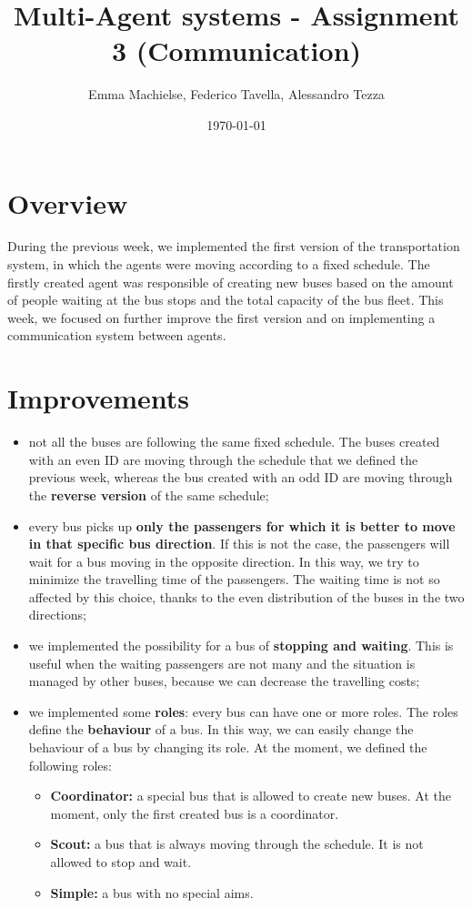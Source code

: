 \documentclass[a4paper]{article}
\title{Multi-Agent systems - Assignment 3 (Communication)}
\author{Emma Machielse, Federico Tavella, Alessandro Tezza}
\date{\today}
\begin{document}
\maketitle

\section{Overview}

During the previous week, we implemented the first version of the transportation system, in which the agents were moving according to a fixed schedule. The firstly created agent was responsible of creating new buses based on the amount of people waiting at the bus stops and the total capacity of the bus fleet. This week, we focused on further improve the first version and on implementing a communication system between agents.

\section{Improvements}

\begin{itemize}
\item not all the buses are following the same fixed schedule. The buses created with an even ID are moving through the schedule that we defined the previous week, whereas the bus created with an odd ID are moving through the \textbf{reverse version} of the same schedule;
\item every bus picks up \textbf{only the passengers for which it is better to move in that specific bus direction}. If this is not the case, the passengers will wait for a bus moving in the opposite direction. In this way, we try to minimize the travelling time of the passengers. The waiting time is not so affected by this choice, thanks to the even distribution of the buses in the two directions;
\item we implemented the possibility for a bus of \textbf{stopping and waiting}. This is useful when the waiting passengers are not many and the situation is managed by other buses, because we can decrease the travelling costs;
\item we implemented some \textbf{roles}: every bus can have one or more roles. The roles define the \textbf{behaviour} of a bus. In this way, we can easily change the behaviour of a bus by changing its role. At the moment, we defined the following roles:
	\begin{itemize}
	\item \textbf{Coordinator: } a special bus that is allowed to create new buses. At the moment, only the first created bus is a coordinator.
	\item \textbf{Scout: } a bus that is always moving through the schedule. It is not allowed to stop and wait.
	\item \textbf{Simple:} a bus with no special aims.
	\end{itemize}	 
\end{itemize}
\end{document}
